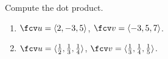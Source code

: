 Compute the dot product.

\begin{enumerate}
\item $\fcv u=\langle 2,-3,5\rangle$, $\fcv v=\langle -3, 5,7 \rangle $.

\item $\fcv u=\langle \frac{1}{2},\frac{1}{3},\frac{1}{4}\rangle$, $\fcv v=\langle \frac{1}{3}, \frac{1}{4},\frac{1}{5} \rangle $.

\end{enumerate}